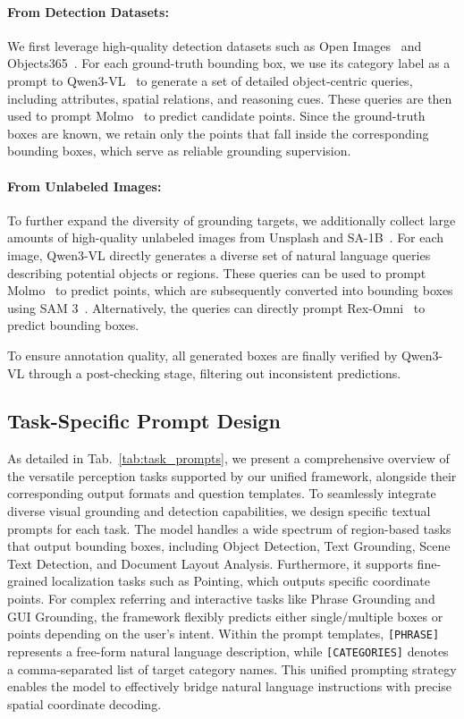 \paragraph{From Detection Datasets:}
We first leverage high-quality detection datasets such as Open Images~\citep{kuznetsova2020open} and Objects365~\citep{Shao_2019_ICCV}. For each ground-truth bounding box, we use its category label as a prompt to Qwen3-VL~\citep{bai2025qwen3vltechnicalreport} to generate a set of detailed object-centric queries, including attributes, spatial relations, and reasoning cues. These queries are then used to prompt Molmo~\citep{deitke2025molmo} to predict candidate points. Since the ground-truth boxes are known, we retain only the points that fall inside the corresponding bounding boxes, which serve as reliable grounding supervision.

\paragraph{From Unlabeled Images:}
To further expand the diversity of grounding targets, we additionally collect large amounts of high-quality unlabeled images from Unsplash and SA-1B~\citep{kirillov2023segment}. For each image, Qwen3-VL directly generates a diverse set of natural language queries describing potential objects or regions. These queries can be used to prompt Molmo~\citep{deitke2025molmo} to predict points, which are subsequently converted into bounding boxes using SAM 3~\citep{carion2025sam3segmentconcepts}. Alternatively, the queries can directly prompt Rex-Omni~\citep{jiang2025rexomni} to predict bounding boxes. 

To ensure annotation quality, all generated boxes are finally verified by Qwen3-VL\citep{bai2025qwen3vltechnicalreport} through a post-checking stage, filtering out inconsistent predictions.

\subsection{Task-Specific Prompt Design}

As detailed in Tab.~\ref{tab:task_prompts}, we present a comprehensive overview of the versatile perception tasks supported by our unified framework, alongside their corresponding output formats and question templates. To seamlessly integrate diverse visual grounding and detection capabilities, we design specific textual prompts for each task. The model handles a wide spectrum of region-based tasks that output bounding boxes, including Object Detection, Text Grounding, Scene Text Detection, and Document Layout Analysis. Furthermore, it supports fine-grained localization tasks such as Pointing, which outputs specific coordinate points. For complex referring and interactive tasks like Phrase Grounding and GUI Grounding, the framework flexibly predicts either single/multiple boxes or points depending on the user's intent. Within the prompt templates, \texttt{[PHRASE]} represents a free-form natural language description, while \texttt{[CATEGORIES]} denotes a comma-separated list of target category names. This unified prompting strategy enables the model to effectively bridge natural language instructions with precise spatial coordinate decoding.


